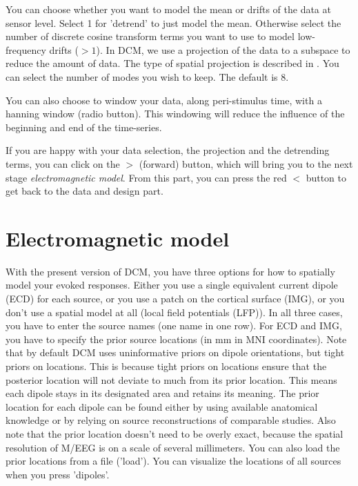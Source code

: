 You can choose whether you want to model the mean or drifts of the data at sensor level. Select 1 for 'detrend' to just model the mean. Otherwise select the number of discrete cosine transform terms you want to use to model low-frequency drifts ($> 1$). In DCM, we use a projection of the data to a subspace to reduce the amount of data. The type of spatial projection is described in \cite{matthias_dcm_constraints}. You can select the number of modes you wish to keep. The default is 8.

You can also choose to window your data, along peri-stimulus time,
with a hanning window (radio button). This windowing will reduce the
influence of the beginning and end of the time-series.

If you are happy with your data selection, the projection and the detrending
terms, you can click on the $>$ (forward) button, which will bring you to
the next stage \textit{electromagnetic model}. From this part, you can
press the red $<$ button to get back to the data and design part.

\section{Electromagnetic model}
With the present version of DCM, you have three options for how to spatially
model your evoked responses. Either you use a single equivalent
current dipole (ECD) for each source, or you use a patch on the
cortical surface (IMG), or you don't use a spatial model at all (local field potentials (LFP)). In all three cases, you have to enter the source names (one
name in one row). For ECD and IMG, you have to specify the prior source locations (in mm in MNI
coordinates). Note that by default DCM uses  uninformative priors on
dipole orientations, but tight priors on locations. This is because tight priors on locations ensure that the posterior location will not deviate to much from its prior location. This means each dipole stays in its designated area and retains its meaning. The prior location for each
dipole can be found either by using available anatomical knowledge or
by relying on source reconstructions of comparable studies. Also note
that the prior location doesn't need to be overly exact, because the
spatial resolution of M/EEG is on a scale of several millimeters.
You can also load the prior locations from a file
('load'). You can visualize the locations of all sources when you
press 'dipoles'.

